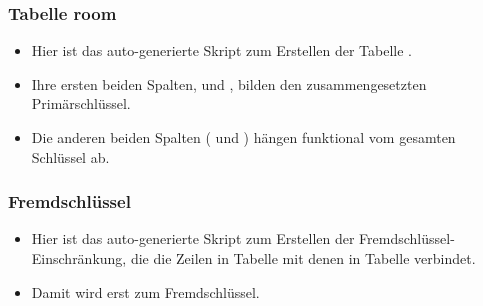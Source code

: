 \documentclass[aspectratio=169,mathserif,notheorems]{beamer}%
\begin{document}
%
%
\begin{frame}[t]%
\frametitle{Tabelle room}%
\parbox{0.435\linewidth}{\small%
\begin{itemize}%
%
\item Hier ist das auto-generierte Skript zum Erstellen der Tabelle .%
%
\item<2-> Ihre ersten beiden Spalten,  und , bilden den zusammengesetzten Primärschlüssel.%
%
\item<3-> Die anderen beiden Spalten ( und ) hängen funktional vom gesamten Schlüssel ab.%
\end{itemize}%
}%
%
%
%
\end{frame}%
%
%
\begin{frame}[t]%
\frametitle{Fremdschlüssel}%
\parbox{0.435\linewidth}{\small%
\begin{itemize}%
%
\item Hier ist das auto-generierte Skript zum Erstellen der Fremdschlüssel-Einschränkung, die die Zeilen in Tabelle  mit denen in Tabelle  verbindet.%
%
\item<2-> Damit wird  erst zum Fremdschlüssel.
%
\end{itemize}%
}%
%
%
%
\end{frame}%
%
%
\end{document}
